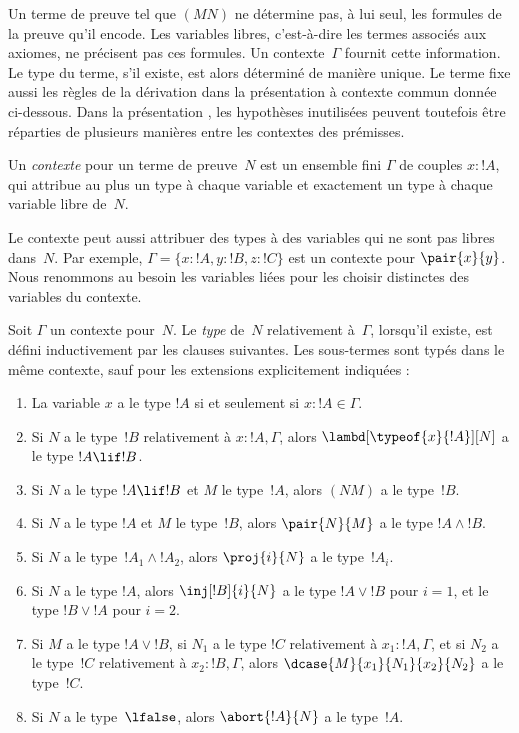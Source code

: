 \documentclass[../../../include/open-logic-section]{subfiles}
\begin{document}


Un terme de preuve tel que $(MN)$ ne détermine pas, à lui seul,
les formules de la preuve qu'il encode. Les variables libres,
c'est-à-dire les termes associés aux axiomes, ne précisent pas
ces formules. Un contexte~$\Gamma$ fournit cette information.
Le type du terme, s'il existe, est alors déterminé de manière
unique. Le terme fixe aussi les règles de la dérivation dans
la présentation à contexte commun donnée ci-dessous.
Dans la présentation , les hypothèses inutilisées
peuvent toutefois être réparties de plusieurs manières entre
les contextes des prémisses.

\begin{defn}
Un \emph{contexte} pour un terme de preuve~$N$ est un ensemble
fini $\Gamma$ de couples $x : !A$, qui attribue au plus un type
à chaque variable et exactement un type à chaque variable
libre de~$N$.
\end{defn}

Le contexte peut aussi attribuer des types à des variables
qui ne sont pas libres dans~$N$.
Par exemple, $\Gamma = \{x:!A, y:!B, z:!C\}$ est un contexte
pour $\pair{x}{y}$.
Nous renommons au besoin les variables liées pour les choisir
distinctes des variables du contexte.

\begin{defn}
Soit $\Gamma$ un contexte pour~$N$.
Le \emph{type} de~$N$ relativement à~$\Gamma$, lorsqu'il existe,
est défini inductivement par les clauses suivantes.
Les sous-termes sont typés dans le même contexte,
sauf pour les extensions explicitement indiquées :
\begin{enumerate}
\item La variable $x$ a le type $!A$ si et seulement si
  $x:!A \in \Gamma$.
\item Si $N$ a le type~$!B$ relativement à $x:!A, \Gamma$,
  alors $\lambd[\typeof{x}{!A}][N]$ a le type $!A \lif !B$.
\item Si $N$ a le type $!A \lif !B$ et $M$ le type~$!A$,
  alors $(NM)$ a le type~$!B$.
\item Si $N$ a le type $!A$ et $M$ le type~$!B$, alors
  $\pair{N}{M}$ a le type $!A \land !B$.
\item Si $N$ a le type~$!A_1 \land !A_2$, alors
  $\proj{i}{N}$ a le type~$!A_i$.
\item Si $N$ a le type $!A$, alors $\inj[!B]{i}{N}$
  a le type $!A \lor !B$ pour $i=1$, et le type
  $!B \lor !A$ pour $i=2$.
\item Si $M$ a le type $!A \lor !B$, si $N_1$ a le type
  $!C$ relativement à $x_1:!A, \Gamma$, et si $N_2$
  a le type~$!C$ relativement à $x_2:!B, \Gamma$, alors
  $\dcase{M}{x_1}{N_1}{x_2}{N_2}$ a le type~$!C$.
\item Si $N$ a le type~$\lfalse$, alors $\abort{!A}{N}$
  a le type~$!A$.
\end{enumerate}
\end{defn}
\end{document}
